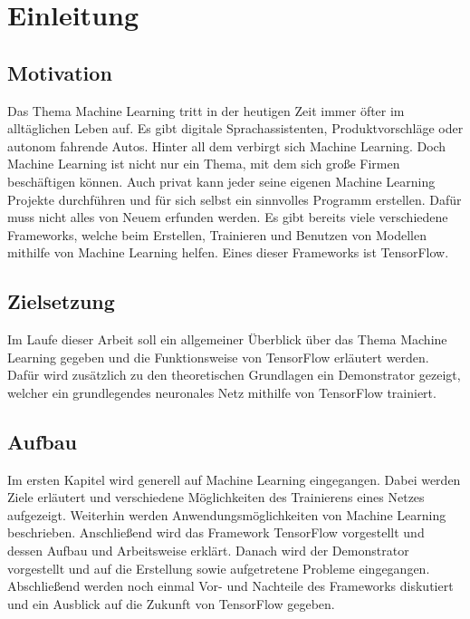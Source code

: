 \chapter{Einleitung}  
\label{chap:einleitung}
\chapterauthor{\authorMarco}

\section{Motivation}
\label{sec:motivation}
Das Thema Machine Learning tritt in der heutigen Zeit immer öfter im alltäglichen Leben auf. Es gibt digitale Sprachassistenten, Produktvorschläge oder autonom fahrende Autos. Hinter all dem verbirgt sich Machine Learning. Doch Machine Learning ist nicht nur ein Thema, mit dem sich große Firmen beschäftigen können. Auch privat kann jeder seine eigenen Machine Learning Projekte durchführen und für sich selbst ein sinnvolles Programm erstellen. Dafür muss nicht alles von Neuem erfunden werden. Es gibt bereits viele verschiedene Frameworks, welche beim Erstellen, Trainieren und Benutzen von Modellen mithilfe von Machine Learning helfen. Eines dieser Frameworks ist TensorFlow.

\section{Zielsetzung}
\label{sec:zielsetzung}
Im Laufe dieser Arbeit soll ein allgemeiner Überblick über das Thema Machine Learning gegeben und die Funktionsweise von TensorFlow erläutert werden. Dafür wird zusätzlich zu den theoretischen Grundlagen ein Demonstrator gezeigt, welcher ein grundlegendes neuronales Netz mithilfe von TensorFlow trainiert.

\section{Aufbau}
\label{sec:aufbauArbeit}
Im ersten Kapitel wird generell auf Machine Learning eingegangen. Dabei werden Ziele erläutert und verschiedene Möglichkeiten des Trainierens eines Netzes aufgezeigt. Weiterhin werden Anwendungsmöglichkeiten von Machine Learning beschrieben. Anschließend wird das Framework TensorFlow vorgestellt und dessen Aufbau und Arbeitsweise erklärt. Danach wird der Demonstrator vorgestellt und auf die Erstellung sowie aufgetretene Probleme eingegangen. Abschließend werden noch einmal Vor- und Nachteile des Frameworks diskutiert und ein Ausblick auf die Zukunft von TensorFlow gegeben.